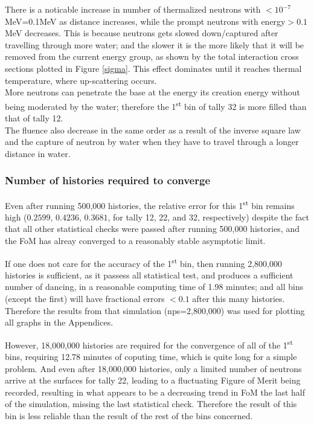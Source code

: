 \documentclass[a4paper, 11pt]{article}
\begin{document}
\begin{compactenum}
	There is a noticable increase in number of thermalized neutrons with $<10^{-7}$MeV=0.1MeV as distance increases, while the prompt neutrons with energy$>0.1$MeV decreases. This is because neutrons gets slowed down/captured after travelling through more water; and the slower it is the more likely that it will be removed from the current energy group, as shown by the total interaction cross sections plotted in Figure \ref{sigma}. This effect dominates until it reaches thermal temperature, where up-scattering occurs.
	\\More neutrons can penetrate the base at the energy its creation energy without being moderated by the water; therefore the 1\textsuperscript{st} bin of tally 32 is more filled than that of tally 12. 
	\\The fluence also decrease in the same order as a result of the inverse square law and the capture of neutron by water when they have to travel through a longer distance in water.
\end{compactenum}
\subsubsection{Number of histories required to converge}\label{Ex1NumHist}
Even after running 500,000 histories, the relative error for this 1\textsuperscript{st} bin remains high ($0.2599$, $0.4236$, $0.3681$, for tally 12, 22, and 32, respectively) despite the fact that all other statistical checks were passed after running 500,000 histories, and the FoM has alreay converged to a reasonably stable asymptotic limit.

If one does not care for the accuracy of the 1\textsuperscript{st} bin, then running 2,800,000 histories is sufficient, as it passess all statistical test, and produces a sufficient number of dancing, in a reasonable computing time of 1.98 minutes; and all bins (except the first) will have fractional errors $< 0.1$ after this many histories. Therefore the results from that simulation (nps=2,800,000) was used for plotting all graphs in the Appendices.

However, 18,000,000 histories are required for the convergence of all of the 1\textsuperscript{st} bins, requiring 12.78 minutes of coputing time, which is quite long for a simple problem. And even after 18,000,000 histories, only a limited number of neutrons arrive at the surfaces for tally 22, leading to a fluctuating Figure of Merit being recorded, resulting in what appears to be a decreasing trend in FoM the last half of the simulation, missing the last statistical check. Therefore the result of this bin is less reliable than the result of the rest of the bins concerned.
\end{document}
